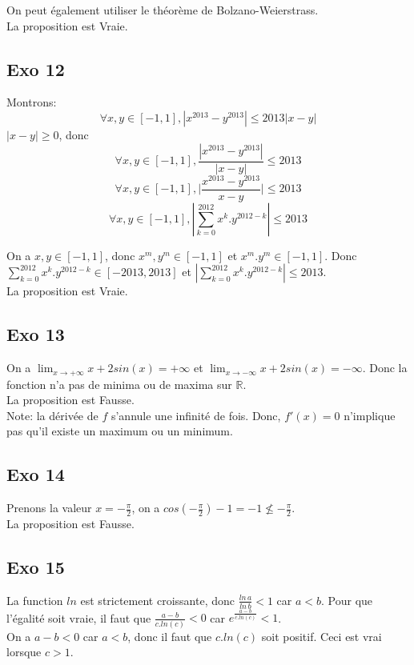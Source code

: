 \documentclass[]{book}
\theoremstyle{definition}
\newcommand{\bb}[1]{\mathbb{#1}}
\newcommand{\R}{\bb{R}}
\begin{document}
On peut \'egalement utiliser le th\'eor\`eme de Bolzano-Weierstrass.\\

La proposition est Vraie.

\subsection*{Exo 12}
Montrons:
$$\forall x,y \in [-1,1],|x^{2013} - y^{2013}| \le 2013|x-y|$$
$|x-y| \ge 0$, donc
$$\forall x,y \in [-1,1],\frac{|x^{2013} - y^{2013}|}{|x-y|} \le 2013$$
$$\forall x,y \in [-1,1],\Big| \frac{x^{2013} - y^{2013}}{x-y} \Big| \le 2013$$
$$\forall x,y \in [-1,1], |\sum_{k=0}^{2012}x^k.y^{2012-k}| \le 2013$$

On a $x,y \in [-1,1]$, donc $x^m,y^m \in [-1,1]$ et $x^m.y^m \in [-1,1]$. Donc $\sum_{k=0}^{2012}x^k.y^{2012-k} \in [-2013,2013]$ et $|\sum_{k=0}^{2012}x^k.y^{2012-k}| \le 2013$.
\\

La proposition est Vraie.

\subsection*{Exo 13}

On a $\lim_{x \to +\infty} x + 2sin(x) = +\infty$ et $\lim_{x \to -\infty} x + 2sin(x) = -\infty$. Donc la fonction n'a pas de minima ou de maxima sur $\R$.\\

La proposition est Fausse.\\

Note: la d\'eriv\'ee de $f$ s'annule une infinit\'e de fois. Donc, $f'(x)=0$ n'implique pas qu'il existe un maximum ou un minimum.

\subsection*{Exo 14}
Prenons la valeur $x = -\frac{\pi}{2}$, on a $cos(-\frac{\pi}{2})-1 = -1 \nleq -\frac{\pi}{2}$.\\


La proposition est Fausse.


\subsection*{Exo 15}
La function $ln$ est strictement croissante, donc $\frac{ln\,a}{ln\,b} < 1$ car $a<b$. Pour que l'\'egalit\'e soit vraie, il faut que $\frac{a-b}{c.ln(c)} < 0$ car $e^{\frac{a-b}{c.ln(c)}} < 1$.\\
On a $a-b < 0$ car $a<b$, donc il faut que $c.ln(c)$ soit positif. Ceci est vrai lorsque $c > 1$.\\
\end{document}

